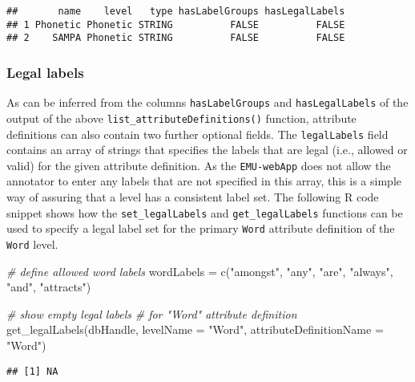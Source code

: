 \documentclass[
]{book}
\newenvironment{Shaded}{\begin{snugshade}}{\end{snugshade}}
\newcommand{\AttributeTok}[1]{\textcolor[rgb]{0.77,0.63,0.00}{#1}}
\newcommand{\CommentTok}[1]{\textcolor[rgb]{0.56,0.35,0.01}{\textit{#1}}}
\newcommand{\FunctionTok}[1]{\textcolor[rgb]{0.00,0.00,0.00}{#1}}
\newcommand{\NormalTok}[1]{#1}
\newcommand{\OtherTok}[1]{\textcolor[rgb]{0.56,0.35,0.01}{#1}}
\newcommand{\StringTok}[1]{\textcolor[rgb]{0.31,0.60,0.02}{#1}}
\begin{document}
\begin{verbatim}
##       name    level   type hasLabelGroups hasLegalLabels
## 1 Phonetic Phonetic STRING          FALSE          FALSE
## 2    SAMPA Phonetic STRING          FALSE          FALSE
\end{verbatim}

\hypertarget{subsubsec:emuDBlegalLabels}{%
\subsubsection{Legal labels}\label{subsubsec:emuDBlegalLabels}}

As can be inferred from the columns \texttt{hasLabelGroups} and \texttt{hasLegalLabels} of the output of the above \texttt{list\_attributeDefinitions()} function, attribute definitions can also contain two further optional fields. The \texttt{legalLabels} field contains an array of strings that specifies the labels that are legal (i.e., allowed or valid) for the given attribute definition. As the \texttt{EMU-webApp} does not allow the annotator to enter any labels that are not specified in this array, this is a simple way of assuring that a level has a consistent label set. The following R code snippet shows how the \texttt{set\_legalLabels} and \texttt{get\_legalLabels} functions can be used to specify a legal label set for the primary \texttt{Word} attribute definition of the \texttt{Word} level.

\begin{Shaded}
\begin{Highlighting}[]
\CommentTok{\# define allowed word labels}
\NormalTok{wordLabels }\OtherTok{=} \FunctionTok{c}\NormalTok{(}\StringTok{"amongst"}\NormalTok{, }\StringTok{"any"}\NormalTok{, }\StringTok{"are"}\NormalTok{,}
               \StringTok{"always"}\NormalTok{, }\StringTok{"and"}\NormalTok{, }\StringTok{"attracts"}\NormalTok{)}

\CommentTok{\# show empty legal labels}
\CommentTok{\# for "Word" attribute definition}
\FunctionTok{get\_legalLabels}\NormalTok{(dbHandle,}
                \AttributeTok{levelName =} \StringTok{"Word"}\NormalTok{,}
                \AttributeTok{attributeDefinitionName =} \StringTok{"Word"}\NormalTok{)}
\end{Highlighting}
\end{Shaded}

\begin{verbatim}
## [1] NA
\end{verbatim}
\end{document}
